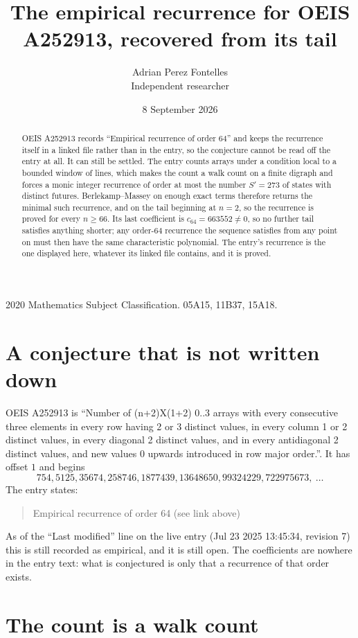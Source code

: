 \documentclass[11pt,a4paper]{article}
\title{The empirical recurrence for OEIS A252913, recovered from its tail}
\author{Adrian Perez Fontelles\\ \small Independent researcher}
\date{8 September 2026}
\theoremstyle{plain}
\theoremstyle{definition}
\begin{document}
\maketitle

\begin{abstract}
OEIS A252913 records ``Empirical recurrence of order $64$'' and keeps the recurrence itself in
a linked file rather than in the entry, so the conjecture cannot be read off the entry at all.
It can still be settled. The entry counts arrays under a condition local to a bounded window of
lines, which makes the count a walk count on a finite digraph and forces a monic integer
recurrence of order at most the number $S'=273$ of states with distinct futures. Berlekamp--Massey on
enough exact terms therefore returns the minimal such recurrence, and on the tail beginning at $n=2$, so the recurrence is proved for every $n\ge66$.
Its last coefficient is $c_{64}=663552\neq0$, so no further tail satisfies anything
shorter; any order-$64$ recurrence the sequence satisfies from any point on must then have
the same characteristic polynomial. The entry's recurrence is the one displayed here, whatever
its linked file contains, and it is proved.
\end{abstract}

\noindent\small 2020 Mathematics Subject Classification. 05A15, 11B37, 15A18.\normalsize

\section{A conjecture that is not written down}

OEIS A252913 is ``Number of (n+2)X(1+2) 0..3 arrays with every consecutive three elements in every row having 2 or 3 distinct values, in every column 1 or 2 distinct values, in every diagonal 2 distinct values, and in every antidiagonal 2 distinct values, and new values 0 upwards introduced in row major order.''. It has offset $1$ and begins
\[
754, 5125, 35674, 258746, 1877439, 13648650, 99324229, 722975673,\ \dots
\]
The entry states:
\begin{quote}
Empirical recurrence of order 64 (see link above)
\end{quote}
As of the ``Last modified'' line on the live entry (Jul 23 2025 13:45:34, revision 7)
this is still recorded as empirical, and it is still open. The coefficients are nowhere in the
entry text: what is conjectured is only that a recurrence of that order exists.

\section{The count is a walk count}
\end{document}
